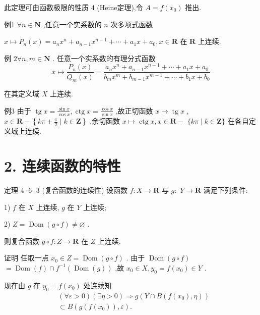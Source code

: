 此定理可由函数极限的性质 4 (Heine定理),令 $A = f\left( {x}_{0}\right)$ 推出.

例1 $\forall n \in  \mathbf{N}$ ,任意一个实系数的 $n$ 次多项式函数

$x \mapsto  {P}_{n}\left( x\right)  = {a}_{n}{x}^{n} + {a}_{n - 1}{x}^{n - 1} + \cdots  + {a}_{1}x + {a}_{0},x \in  \mathbf{R}$ 在 $\mathbf{R}$ 上连续.

例 $2\forall n,m \in  \mathbf{N}$ . 任意一个实系数的有理分式函数
$$x \mapsto  \frac{{P}_{n}\left( x\right) }{{Q}_{m}\left( x\right) } = \frac{{a}_{n}{x}^{n} + {a}_{n - 1}{x}^{n - 1} + \cdots  + {a}_{1}x + {a}_{0}}{{b}_{m}{x}^{m} + {b}_{m - 1}{x}^{m - 1} + \cdots  + {b}_{1}x + {b}_{0}}$$

在其定义域 $X$ 上连续.

例3 由于 $\operatorname{tg}x = \frac{\sin x}{\cos x},\operatorname{ctg}x = \frac{\cos x}{\sin x}$ ,故正切函数 $x \mapsto  \operatorname{tg}x$ , $x \in  \mathbf{R} - \left\{  {{k\pi } + \frac{\pi }{2} \mid  k \in  \mathbf{Z}}\right\}$ ,余切函数 $x \mapsto  \operatorname{ctg}x,x \in  \mathbf{R} -$  $\{ {k\pi } \mid  k \in  \mathbf{Z}\}$ 在各自定义域上连续.

\section*{2. 连续函数的特性}

定理 $4 \cdot  6 \cdot  3$ (复合函数的连续性) 设函数 $f : X \rightarrow  \mathbf{R}$ 与 $g :$  $Y \rightarrow  \mathbf{R}$ 满足下列条件:

1) $f$ 在 $X$ 上连续, $g$ 在 $Y$ 上连续;

2) $Z = \operatorname{Dom}\left( {g \circ  f}\right)  \neq  \varnothing$ .

则复合函数 $g \circ  f : Z \rightarrow  \mathbf{R}$ 在 $Z$ 上连续.

证明 任取一点 ${x}_{0} \in  Z = \operatorname{Dom}\left( {g \circ  f}\right)$ . 由于 $\operatorname{Dom}\left( {g \circ  f}\right)$  $= \operatorname{Dom}\left( f\right)  \cap  {f}^{-1}\left( {\operatorname{Dom}\left( g\right) }\right)$ ,故 ${x}_{0} \in  X,{y}_{0} = f\left( {x}_{0}\right)  \in  Y$ .

现在由 $g$ 在 ${y}_{0} = f\left( {x}_{0}\right)$ 处连续知
\begin{align*}
	&\left( {\forall \varepsilon  > 0}\right) \left( {\exists \eta  > 0}\right)  \Rightarrow  g\left( {Y \cap  B\left( {f\left( {x}_{0}\right) ,\eta }\right) }\right)\\
	&\subset  B\left( {g\left( {f\left( {x}_{0}\right) }\right) ,\varepsilon }\right) .
\end{align*}

